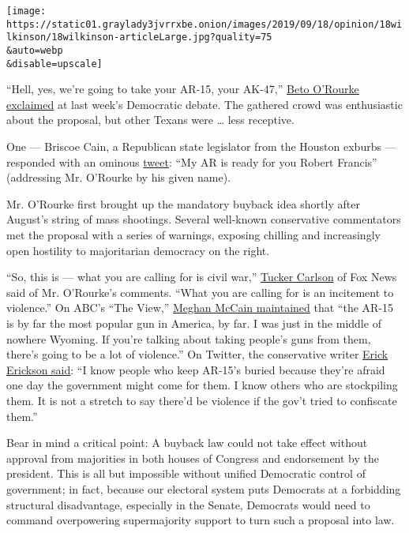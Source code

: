 \texttt{[image: https://static01.graylady3jvrrxbe.onion/images/2019/09/18/opinion/18wilkinson/18wilkinson-articleLarge.jpg?quality=75\\\&auto=webp\\\&disable=upscale]}

``Hell, yes, we're going to take your AR-15, your AK-47,''
\href{https://www.nytimes3xbfgragh.onion/2019/09/12/us/orourke-debate-guns-take-ar15.html?smtyp=cur\&smid=tw-nytimes}{Beto
O'Rourke exclaimed} at last week's Democratic debate. The gathered crowd
was enthusiastic about the proposal, but other Texans were \ldots{} less
receptive.

One --- Briscoe Cain, a Republican state legislator from the Houston
exburbs --- responded with an ominous
\href{https://twitter.com/BetoORourke/status/1172359875093061632/photo/1}{tweet}:
``My AR is ready for you Robert Francis'' (addressing Mr. O'Rourke by
his given name).

Mr. O'Rourke first brought up the mandatory buyback idea shortly after
August's string of mass shootings. Several well-known conservative
commentators met the proposal with a series of warnings, exposing
chilling and increasingly open hostility to majoritarian democracy on
the right.

``So, this is --- what you are calling for is civil war,''
\href{https://www.mediamatters.org/tucker-carlson/tucker-carlson-says-gun-buyback-program-will-lead-civil-war}{Tucker
Carlson} of Fox News said of Mr. O'Rourke's comments. ``What you are
calling for is an incitement to violence.'' On ABC's ``The View,''
\href{https://twitter.com/justinbaragona/status/1168928087163248640?ref_src=twsrc\%5Etfw\%7Ctwcamp\%5Etweetembed\%7Ctwterm\%5E1168928087163248640\&ref_url=https\%3A\%2F\%2Fwww.motherjones.com\%2Fpolitics\%2F2019\%2F09\%2Fbriscoe-cain-beto-orourke\%2F}{Meghan
McCain maintained} that ``the AR-15 is by far the most popular gun in
America, by far. I was just in the middle of nowhere Wyoming. If you're
talking about taking people's guns from them, there's going to be a lot
of violence.'' On Twitter, the conservative writer
\href{https://twitter.com/EWErickson/status/1169339895002914816}{Erick
Erickson said}: ``I know people who keep AR-15's buried because they're
afraid one day the government might come for them. I know others who are
stockpiling them. It is not a stretch to say there'd be violence if the
gov't tried to confiscate them.''

Bear in mind a critical point: A buyback law could not take effect
without approval from majorities in both houses of Congress and
endorsement by the president. This is all but impossible without unified
Democratic control of government; in fact, because our electoral system
puts Democrats at a forbidding structural disadvantage, especially in
the Senate, Democrats would need to command overpowering supermajority
support to turn such a proposal into law.


